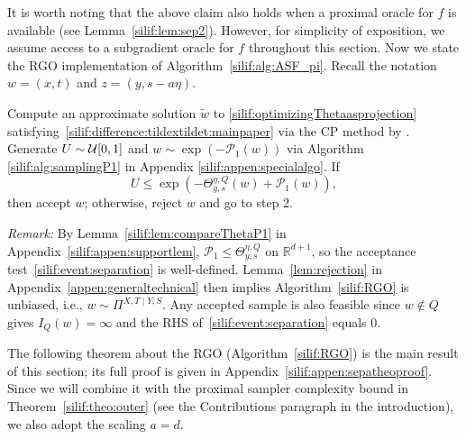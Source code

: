 \documentclass[11pt,letterpaper]{article}
\newcommand{\R}{\mathbb{R}}
\newcommand{\brac}[1]{\left( #1\right)}
\begin{document}
It is worth noting that the above claim also holds when a proximal oracle for $f$ is available (see Lemma~\ref{silif:lem:sep2}). However, for simplicity of exposition, we assume access to a subgradient oracle for $f$ throughout this section. Now we state the RGO implementation of Algorithm~\ref{silif:alg:ASF_pi}. Recall the notation $w=(x,t)$ and $z=(y,s-a\eta)$. 
\begin{algorithm}[H]
	\caption{RGO implementation  of Algorithm~\ref{silif:alg:ASF_pi}} 
	\label{silif:RGO}
	\begin{algorithmic}[1]
		\State  Compute an approximate solution $\tilde{w}$ to \eqref{silif:optimizingThetaasprojection} satisfying~\eqref{silif:difference:tildextildet:mainpaper} via the CP method by \cite{jiang2020cuttingplane}. 
        \State  Generate $U\sim {\cal U}[0,1]$ and $w\sim \exp\brac{-\mathcal{P}_1(w)}$ via Algorithm \ref{silif:alg:samplingP1} in Appendix \ref{silif:appen:specialalgo}. 
		\State  If 
		\begin{equation}\label{silif:event:separation}
			U \leq  \exp\brac{-\Theta_{y,s}^{\eta,Q}(w)+ \mathcal{P}_1(w)},
		\end{equation}
		then accept $w$; otherwise, reject $w$ and go to step 2.
	\end{algorithmic}
\end{algorithm}


\textit{Remark:}
By Lemma~\ref{silif:lem:compareThetaP1} in Appendix~\ref{silif:appen:supportlem}, $\mathcal{P}_1\le \Theta_{y,s}^{\eta,Q}$ on $\R^{d+1}$, so the acceptance test~\eqref{silif:event:separation} is well-defined. Lemma~\ref{lem:rejection} in Appendix~\ref{appen:generaltechnical} then implies Algorithm~\ref{silif:RGO} is unbiased, i.e., $w\sim \Pi^{X,T\mid Y,S}$. Any accepted sample is also feasible since $w\notin Q$ gives $I_Q(w)=\infty$ and the RHS of~\eqref{silif:event:separation} equals $0$.

The following theorem about the RGO (Algorithm~\ref{silif:RGO}) is the main result of this section; its full proof is given in Appendix~\ref{silif:appen:sepatheoproof}. Since we will combine it with the proximal sampler complexity bound in Theorem~\ref{silif:theo:outer} (see the Contributions paragraph in the introduction), we also adopt the scaling $a=d$.
\end{document}
